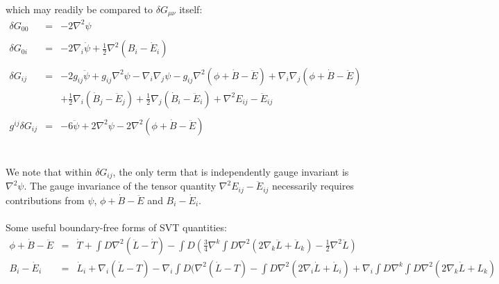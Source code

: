 \documentclass[10pt,letterpaper]{article}
\numberwithin{equation}{section}
\begin{document}
which may readily be compared to $\delta G_{\mu\nu}$ itself:
\begin{eqnarray}
\delta G_{00} &=& -2 \nabla^2 \psi
\nonumber\\ \nonumber\\
\delta G_{0i} &=& -2\nabla_i \dot\psi + \tfrac12 \nabla^2 (B_i-\dot E_i)
\nonumber\\ \nonumber\\
\delta G_{ij} &=& -2g_{ij}\ddot \psi+g_{ij} \nabla^2\psi - \nabla_i\nabla_j \psi
-g_{ij}\nabla^2(\phi + \dot B - \ddot E) + \nabla_i\nabla_j (\phi +\dot B - \ddot E)
\nonumber\\
&& + \tfrac12 \nabla_i (\dot B_j - \ddot E_j) + \tfrac12\nabla_j (\dot B_i - \ddot E_i) +\nabla^2 E_{ij} - \ddot E_{ij}
\nonumber\\ \nonumber\\
g^{ij} \delta G_{ij} &=& -6\ddot \psi + 2\nabla^2 \psi - 2\nabla^2(\phi +\dot B-\ddot E)
\end{eqnarray}
\\ \\
We note that within $\delta G_{ij}$, the only term that is independently gauge invariant is $\nabla^2 \psi$. The gauge invariance of the tensor quantity $\nabla^2 E_{ij}-\ddot E_{ij}$ necessarily requires contributions from $\psi$, $\phi+\dot B-\ddot E$ and $B_i-\dot E_i$. 
\\ \\ Some useful boundary-free forms of SVT quantities:
\begin{eqnarray}
\phi + \dot B - \ddot E &=& \dot T + \int D \nabla^2(\ddot L-\dot T) -
\int D \left( \tfrac34 \nabla^k \int D \nabla^2 (2\nabla_k \ddot L + \ddot L_k)-\tfrac12 \nabla^2\ddot L\right)
\nonumber\\
B_i-\dot E_i &=& \dot L_i + \nabla_i(\dot L-T)-\nabla_i\int D (\nabla^2( \dot L-T)
-\int D\nabla^2 (2\nabla_i \dot L +\dot L_i)
 +\nabla_i \int D\nabla^k \int D \nabla^2(2\nabla_k\dot L+L_k)
 \nonumber\\
\end{eqnarray} 
%
%
\end{document}
